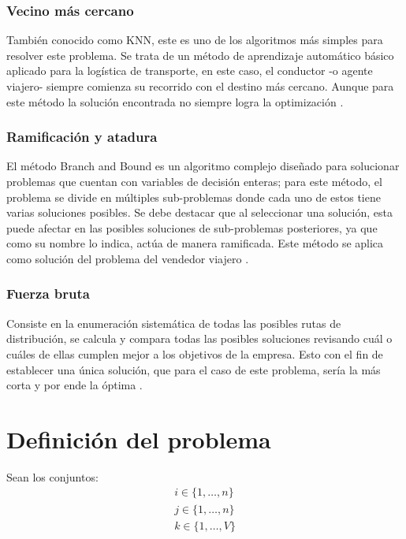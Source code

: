 \documentclass[journal]{IEEEtran}                                                          %
\begin{document}
            \subsubsection{Vecino más cercano}
            
                También conocido como KNN, este es uno de los algoritmos más simples para resolver este problema. Se trata de un método de aprendizaje automático básico aplicado para la logística de transporte, en este caso, el conductor -o agente viajero- siempre comienza su recorrido con el destino más cercano. Aunque para este método la solución encontrada no siempre logra la optimización \cite{trevelingProb}.
    
            \subsubsection{Ramificación y atadura}
            
                El método Branch and Bound es un algoritmo complejo diseñado para solucionar problemas que cuentan con variables de decisión enteras; para este método, el problema se divide en múltiples sub-problemas donde cada uno de estos tiene varias soluciones posibles. Se debe destacar que al seleccionar una solución, esta puede afectar en las posibles soluciones de sub-problemas posteriores, ya que como su nombre lo indica, actúa de manera ramificada. Este método se aplica como solución del problema del vendedor viajero \cite{trevelingProb}.
    
            \subsubsection{Fuerza bruta}
            
                Consiste en la enumeración sistemática de todas las posibles rutas de distribución, se calcula y compara todas las posibles soluciones revisando cuál o cuáles de ellas cumplen mejor a los objetivos de la empresa. Esto con el fin de establecer una única solución, que para el caso de este problema, sería la más corta y por ende la óptima \cite{trevelingProb}.
        
    \section{Definición del problema} \label{definition}
        
        Sean los conjuntos:
        \begin{gather*}
            i \in \{1, \dots, n \} \\
            j \in \{1, \dots, n \} \\
            k \in \{1, \dots, V \}
        \end{gather*}
        
\end{document}
